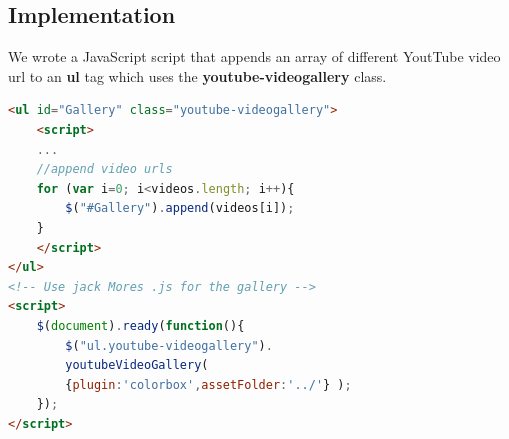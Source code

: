 \subsection{Implementation}
We wrote a JavaScript script that appends an array of different YoutTube video url to an \textbf{ul} tag which uses the \textbf{youtube-videogallery} class.   
\begin{lstlisting}[language=html, caption= 
extracts from the video gallery src,captionpos=b]
<ul id="Gallery" class="youtube-videogallery">
	<script>
	... 
	//append video urls
	for (var i=0; i<videos.length; i++){
		$("#Gallery").append(videos[i]);
	}
	</script>
</ul>
<!-- Use jack Mores .js for the gallery -->
<script>
    $(document).ready(function(){
        $("ul.youtube-videogallery").
        youtubeVideoGallery( 
        {plugin:'colorbox',assetFolder:'../'} );
    });
</script> 
\end{lstlisting}
